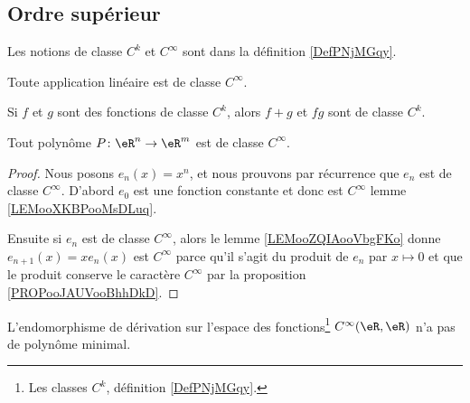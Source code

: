 \subsection{Ordre supérieur}

Les notions de classe \( C^k\) et \( C^{\infty}\) sont dans la définition \ref{DefPNjMGqy}.

\begin{lemma}	\label{LEMooXKBPooMsDLuq}
	Toute application linéaire est de classe \( C^{\infty}\).
\end{lemma}

\begin{proposition}	\label{PROPooJAUVooBhhDkD}
	Si \( f\) et \( g\) sont des fonctions de classe \( C^{k}\), alors \( f+g\) et \( fg\) sont de classe \( C^k\).
\end{proposition}


\begin{proposition}		\label{PROPooMGFBooHWGXyC}
	Tout polynôme \(P \colon \eR^n\to \eR^m  \) est de classe
	\( C^{\infty}\).
\end{proposition}

\begin{proof}
	Nous posons \( e_n(x)=x^n\), et nous prouvons par récurrence que \( e_n\) est de classe \( C^{\infty}\). D'abord \( e_0\) est une fonction constante et donc est \( C^{\infty}\) lemme \ref{LEMooXKBPooMsDLuq}.

	Ensuite si \( e_n\) est de classe \( C^{\infty}\), alors le lemme \ref{LEMooZQIAooVbgFKo} donne \( e_{n+1}(x)=xe_n(x)\) est \( C^{\infty}\) parce qu'il s'agit du produit de \( e_n\) par \( x\mapsto 0\) et que le produit conserve le caractère \( C^{\infty}\) par la proposition \ref{PROPooJAUVooBhhDkD}.
\end{proof}


\begin{proposition}        \label{PROPooZCUSooLUUrxi}
	L'endomorphisme de dérivation sur l'espace des fonctions\footnote{Les classes \( C^k\), définition \ref{DefPNjMGqy}.} \( C^{\infty}(\eR,\eR)\) n'a pas de polynôme minimal.
\end{proposition}

